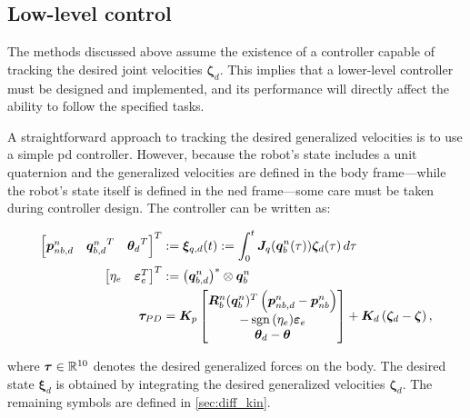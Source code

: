 \subsection{Low-level control}
\label{sec:tpc:low_level_control}

The methods discussed above assume the existence of a controller capable of tracking the desired joint velocities \(\bm{\zeta}_d\). This implies that a lower-level controller must be designed and implemented, and its performance will directly affect the ability to follow the specified tasks.

A straightforward approach to tracking the desired generalized velocities is to use a simple \gls{pd} controller. However, because the robot’s state includes a unit quaternion and the generalized velocities are defined in the body frame—while the robot's state itself is defined in the \gls{ned} frame—some care must be taken during controller design. The controller can be written as:

\begin{subequations}
\label{eq:tau_pd}
\begin{align}
    \begin{bmatrix}
        \bm{p}_{nb,d}^n & {\bm{q}_{b,d}^n}^T & {\bm{\theta}_d}^T
    \end{bmatrix}^T
    &:=
    \bm{\xi}_{q,d}(t) := \int_{0}^{t} \bm{J}_q(\bm{q}_b^n(\tau))\bm{\zeta}_d(\tau)\,d\tau
    \\
    \begin{bmatrix} \eta_e & \bm{\varepsilon}_e^T\end{bmatrix}^T &:= \left(\bm{q}_{b,d}^n\right)^* \otimes \bm{q}_b^n
    \\
    \bm{\tau}_{PD} &= 
    \bm{K}_p \begin{bmatrix}
        \bm{R}_b^n(\bm{q}_b^n)^T\left(\bm{p}_{nb,d}^n - \bm{p}_{nb}^n\right) \\
        -\operatorname{sgn}{(\eta_e)} \bm{\varepsilon}_e \\
        \bm{\theta}_d - \bm{\theta}
    \end{bmatrix} + 
    \bm{K}_d  \left(\bm{\zeta}_d - \bm{\zeta} \right), 
\end{align}
\end{subequations}

where \(\bm{\tau} \in \mathbb{R}^{10}\) denotes the desired generalized forces on the body. The desired state \(\bm{\xi}_d\) is obtained by integrating the desired generalized velocities \(\bm{\zeta}_d\). The remaining symbols are defined in \autoref{sec:diff_kin}.

